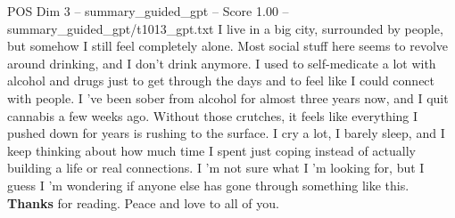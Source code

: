 \begin{textsample}{POS Dim 3 – summary\_guided\_gpt – Score 1.00 – summary\_guided\_gpt/t1013\_gpt.txt}  \label{ex:f3_pos_025}
I live in a big city, surrounded by people, but somehow I still feel completely alone.
Most social stuff here seems to revolve around drinking, and I don't drink anymore.
I used to self-medicate a lot with alcohol and drugs just to get through the days and to feel like I could connect with people.
I ’ve been sober from alcohol for almost three years now, and I quit cannabis a few weeks ago.
Without those crutches, it feels like everything I pushed down for years is rushing to the surface.
I cry a lot, I barely sleep, and I keep thinking about how much time I spent just coping instead of actually building a life or real connections.
I ’m not sure what I ’m looking for, but I guess I ’m wondering if anyone else has gone through something like this. \textbf{Thanks} for reading.
Peace and love to all of you.

\end{textsample}
